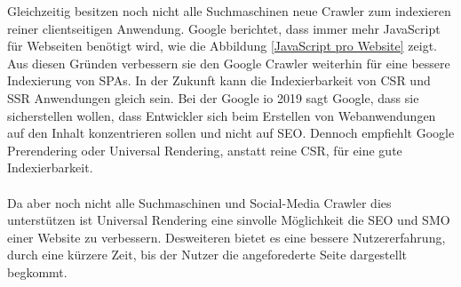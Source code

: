 \documentclass[runningheads]{llncs}
\numberwithin{figure}{section}
\begin{document}
Gleichzeitig besitzen noch nicht alle Suchmaschinen neue Crawler 
zum indexieren reiner clientseitigen Anwendung. 
Google berichtet, dass immer mehr JavaScript für Webseiten benötigt wird, 
wie die Abbildung \ref{JavaScript pro Website} zeigt. 
Aus diesen Gründen verbessern sie den Google Crawler weiterhin für eine bessere Indexierung von SPAs. 
In der Zukunft kann die Indexierbarkeit von CSR und SSR Anwendungen gleich sein. 
Bei der Google io 2019 sagt Google, 
dass sie sicherstellen wollen, 
dass Entwickler sich beim Erstellen von Webanwendungen auf den Inhalt konzentrieren sollen und nicht auf SEO. 
Dennoch empfiehlt Google Prerendering oder Universal Rendering, 
anstatt reine CSR, für eine gute Indexierbarkeit. \cite{WebPerfomance}
\\
\\
Da aber noch nicht alle Suchmaschinen und 
Social-Media Crawler dies unterstützen ist Universal Rendering eine sinvolle Möglichkeit
die SEO und SMO einer Website zu verbessern. Desweiteren bietet es eine bessere Nutzererfahrung,
durch eine kürzere Zeit, bis der Nutzer die angeforederte Seite dargestellt begkommt. 


\newpage
%


\end{document}
